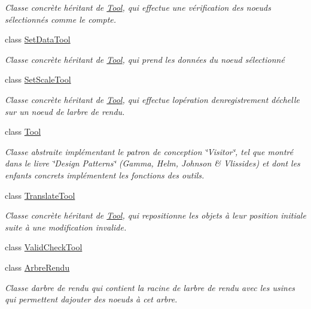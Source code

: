 \begin{DoxyCompactItemize}
\begin{DoxyCompactList}\small\item\em Classe concrète héritant de \hyperlink{class_tool}{Tool}, qui effectue une vérification des noeuds sélectionnés comme le compte. \end{DoxyCompactList}\item 
class \hyperlink{class_set_data_tool}{Set\+Data\+Tool}
\begin{DoxyCompactList}\small\item\em Classe concrète héritant de \hyperlink{class_tool}{Tool}, qui prend les données du noeud sélectionné \end{DoxyCompactList}\item 
class \hyperlink{class_set_scale_tool}{Set\+Scale\+Tool}
\begin{DoxyCompactList}\small\item\em Classe concrète héritant de \hyperlink{class_tool}{Tool}, qui effectue l\textquotesingle{}opération d\textquotesingle{}enregistrement d\textquotesingle{}échelle sur un noeud de l\textquotesingle{}arbre de rendu. \end{DoxyCompactList}\item 
class \hyperlink{class_tool}{Tool}
\begin{DoxyCompactList}\small\item\em Classe abstraite implémentant le patron de conception \char`\"{}\+Visitor\char`\"{}, tel que montré dans le livre \char`\"{}\+Design Patterns\char`\"{} (Gamma, Helm, Johnson \& Vlissides) et dont les enfants concrets implémentent les fonctions des outils. \end{DoxyCompactList}\item 
class \hyperlink{class_translate_tool}{Translate\+Tool}
\begin{DoxyCompactList}\small\item\em Classe concrète héritant de \hyperlink{class_tool}{Tool}, qui repositionne les objets à leur position initiale suite à une modification invalide. \end{DoxyCompactList}\item 
class \hyperlink{class_valid_check_tool}{Valid\+Check\+Tool}
\item 
class \hyperlink{class_arbre_rendu}{Arbre\+Rendu}
\begin{DoxyCompactList}\small\item\em Classe d\textquotesingle{}arbre de rendu qui contient la racine de l\textquotesingle{}arbre de rendu avec les usines qui permettent d\textquotesingle{}ajouter des noeuds à cet arbre. \end{DoxyCompactList}\item 

\end{DoxyCompactItemize}
